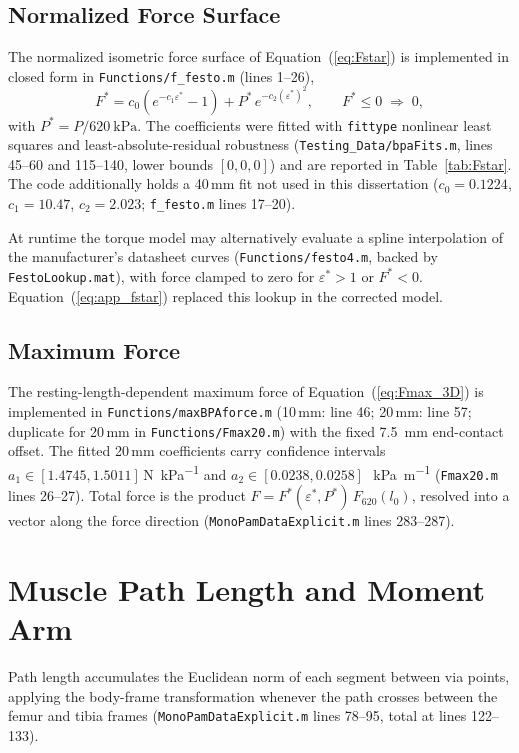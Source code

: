 \subsection{Normalized Force Surface}
The normalized isometric force surface of Equation~(\ref{eq:Fstar}) is implemented in closed form in \texttt{Functions/f\_festo.m} (lines 1--26),
\begin{equation}
    F^{*} = c_{0}\left(e^{-c_{1}\varepsilon^{*}} - 1\right)
            + P^{*}\,e^{-c_{2}(\varepsilon^{*})^{2}},
    \qquad F^{*}\le 0 \;\Rightarrow\; 0,
    \label{eq:app_fstar}
\end{equation}
with $P^{*} = P/\qty{620}{\kPa}$. The coefficients were fitted with \texttt{fittype} nonlinear least squares and least-absolute-residual robustness (\texttt{Testing\_Data/bpaFits.m}, lines 45--60 and 115--140, lower bounds $[0,0,0]$) and are reported in Table~\ref{tab:Fstar}. The code additionally holds a 40\,mm fit not used in this dissertation ($c_0 = 0.1224$, $c_1 = 10.47$, $c_2 = 2.023$; \texttt{f\_festo.m} lines 17--20).

At runtime the torque model may alternatively evaluate a spline interpolation of the manufacturer's datasheet curves (\texttt{Functions/festo4.m}, backed by \texttt{FestoLookup.mat}), with force clamped to zero for $\varepsilon^{*}>1$ or $F^{*}<0$. Equation~(\ref{eq:app_fstar}) replaced this lookup in the corrected model.

\subsection{Maximum Force}
The resting-length-dependent maximum force of Equation~(\ref{eq:Fmax_3D}) is implemented in \texttt{Functions/maxBPAforce.m} (10\,mm: line 46; 20\,mm: line 57; duplicate for 20\,mm in \texttt{Functions/Fmax20.m}) with the fixed \qty{7.5}{\mm} end-contact offset. The fitted 20\,mm coefficients carry confidence intervals $a_1 \in [1.4745, 1.5011]$\,\si{\N\per\kPa} and $a_2 \in [0.0238, 0.0258]$\,\si{\per\kPa\per\metre} (\texttt{Fmax20.m} lines 26--27). Total force is the product $F = F^{*}(\varepsilon^{*},P^{*})\,F_{620}(l_{0})$, resolved into a vector along the force direction (\texttt{MonoPamDataExplicit.m} lines 283--287).

\section{Muscle Path Length and Moment Arm}

Path length accumulates the Euclidean norm of each segment between via points, applying the body-frame transformation whenever the path crosses between the femur and tibia frames (\texttt{MonoPamDataExplicit.m} lines 78--95, total at lines 122--133).

